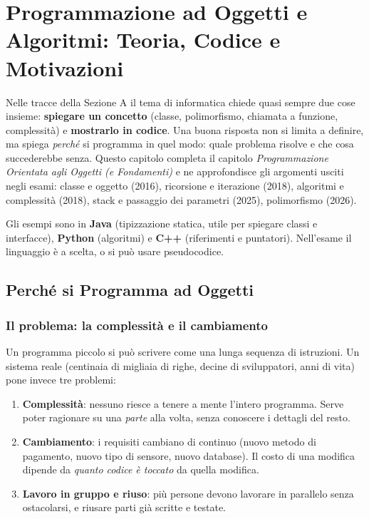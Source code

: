 \chapter[Programmazione e Algoritmi]{Programmazione ad Oggetti e Algoritmi: Teoria, Codice e Motivazioni}

Nelle tracce della Sezione A il tema di informatica chiede quasi sempre due cose insieme: \textbf{spiegare un concetto} (classe, polimorfismo, chiamata a funzione, complessità) e \textbf{mostrarlo in codice}. Una buona risposta non si limita a definire, ma spiega \emph{perché} si programma in quel modo: quale problema risolve e che cosa succederebbe senza. Questo capitolo completa il capitolo \emph{Programmazione Orientata agli Oggetti (e Fondamenti)} e ne approfondisce gli argomenti usciti negli esami: classe e oggetto (2016), ricorsione e iterazione (2018), algoritmi e complessità (2018), stack e passaggio dei parametri (2025), polimorfismo (2026).

Gli esempi sono in \textbf{Java} (tipizzazione statica, utile per spiegare classi e interfacce), \textbf{Python} (algoritmi) e \textbf{C++} (riferimenti e puntatori). Nell'esame il linguaggio è a scelta, o si può usare pseudocodice.

\section{Perché si Programma ad Oggetti}

\subsection{Il problema: la complessità e il cambiamento}
Un programma piccolo si può scrivere come una lunga sequenza di istruzioni. Un sistema reale (centinaia di migliaia di righe, decine di sviluppatori, anni di vita) pone invece tre problemi:
\begin{enumerate}
    \item \textbf{Complessità}: nessuno riesce a tenere a mente l'intero programma. Serve poter ragionare su una \emph{parte} alla volta, senza conoscere i dettagli del resto.
    \item \textbf{Cambiamento}: i requisiti cambiano di continuo (nuovo metodo di pagamento, nuovo tipo di sensore, nuovo database). Il costo di una modifica dipende da \emph{quanto codice è toccato} da quella modifica.
    \item \textbf{Lavoro in gruppo e riuso}: più persone devono lavorare in parallelo senza ostacolarsi, e riusare parti già scritte e testate.
\end{enumerate}

